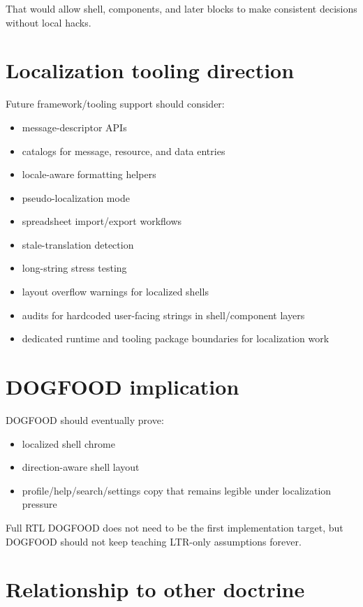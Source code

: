 That would allow shell, components, and later blocks to make consistent decisions without local hacks.

\section{Localization tooling direction}\label{record-051-localization-tooling-direction}

Future framework/tooling support should consider:

\begin{itemize}
\tightlist
\item
  message-descriptor APIs
\item
  catalogs for message, resource, and data entries
\item
  locale-aware formatting helpers
\item
  pseudo-localization mode
\item
  spreadsheet import/export workflows
\item
  stale-translation detection
\item
  long-string stress testing
\item
  layout overflow warnings for localized shells
\item
  audits for hardcoded user-facing strings in shell/component layers
\item
  dedicated runtime and tooling package boundaries for localization work
\end{itemize}

\section{DOGFOOD implication}\label{record-051-dogfood-implication}

DOGFOOD should eventually prove:

\begin{itemize}
\tightlist
\item
  localized shell chrome
\item
  direction-aware shell layout
\item
  profile/help/search/settings copy that remains legible under localization pressure
\end{itemize}

Full RTL DOGFOOD does not need to be the first implementation target, but DOGFOOD should not keep teaching LTR-only assumptions forever.

\section{Relationship to other doctrine}\label{record-051-relationship-to-other-doctrine}

